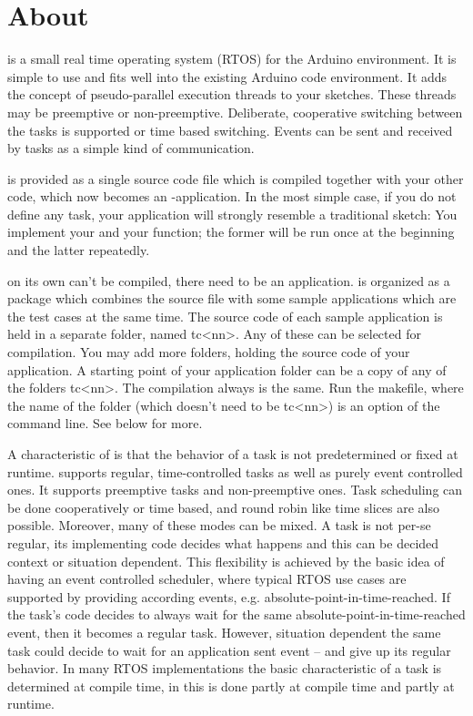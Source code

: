 \chapter{About \rtos{}}
\label{secAbout}

\rtos{} is a small real time operating system (RTOS) for the Arduino
environment. It is simple to use and fits well into the existing Arduino
code environment. It adds the concept of pseudo-parallel execution threads
to your sketches. These threads may be preemptive or non-preemptive.
Deliberate, cooperative switching between the tasks is supported or time
based switching. Events can be sent and received by tasks as a simple kind
of communication.

\rtos{} is provided as a single source code file which is compiled together
with your other code, which now becomes an \rtos-application. In the most
simple case, if you do not define any task, your application will strongly
resemble a traditional sketch: You implement your  and your
 function; the former will be run once at the beginning and
the latter repeatedly.

\rtos{} on its own can't be compiled, there need to be an application.
\rtos{} is organized as a package which combines the \rtos{} source file
with some sample applications which are the test cases at the same time.
The source code of each sample application is held in a separate folder,
named tc\textless nn\textgreater. Any of these can be selected for
compilation. You may add more folders, holding the source code of your
\rtos{} application. A starting point of your application folder can be a
copy of any of the folders tc\textless nn\textgreater. The compilation
always is the same. Run the makefile, where the name of the folder (which
doesn't need to be tc\textless nn\textgreater) is an option of the
command line. See below for more.

A characteristic of \rtos{} is that the behavior of a task is not
predetermined or fixed at runtime. \rtos{} supports regular,
time-controlled tasks as well as purely event controlled ones. It supports
preemptive tasks and non-preemptive ones. Task scheduling can be done
cooperatively or time based, and round robin like time slices are also
possible. Moreover, many of these modes can be mixed. A task is not per-se
regular, its implementing code decides what happens and this can be
decided context or situation dependent. This flexibility is achieved by
the basic idea of having an event controlled scheduler, where typical RTOS
use cases are supported by providing according events, e.g.
absolute-point-in-time-reached. If the task's code decides to always wait
for the same absolute-point-in-time-reached event, then it becomes a
regular task. However, situation dependent the same task could decide to
wait for an application sent event -- and give up its regular behavior. In
many RTOS implementations the basic characteristic of a task is determined
at compile time, in \rtos{} this is done partly at compile time and partly
at runtime.


